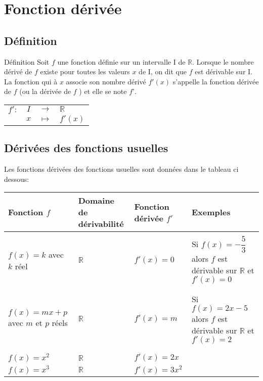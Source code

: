 \documentclass[10pt,a4paper]{article}
\def\R{{\mathbb R}}
\renewcommand{\arraystretch}{0.7}
\theoremstyle{break}
\begin{document}
\section{Fonction dérivée}
\subsection{Définition}
	\begin{bclogo}[couleur = yellow!30, arrondi = 0.1,logo=\bcbook]{Définition}
Soit $f$ une fonction définie sur un intervalle I de $\R$.
Lorsque le nombre dérivé de $f$ existe pour toutes les valeurs $x$ de I, on dit que $f$ est dérivable sur I.
La fonction qui à $x$ associe son nombre dérivé $f'(x)$ s’appelle la fonction dérivée de $f$ (ou la dérivée
de $f$ ) et elle se note $f’$.
	\begin{center}
		\begin{tabular}{lccl}
			$f':$&$I $&$\longrightarrow$&$\mathbb{R}$\\	
			&$x$&$\mapsto$&$f'(x)$\\
		\end{tabular}
	\end{center}	
\end{bclogo}
\subsection{Dérivées des fonctions usuelles}
Les fonctions dérivées des fonctions usuelles sont données dans le tableau ci dessous:
\vspace*{0.5cm}\\
\renewcommand{\arraystretch}{1.5}
\begin{tabular}{|p{4cm}|p{4cm}|p{4cm}|p{4cm}|}
	\hline
	Fonction $f$&Domaine de dérivabilité&Fonction dérivée $f'$&Exemples\\
	\hline
	&&&\\
	$f(x)=k$ \newline avec $k$ réel&$\R$&$f'(x)=0$&Si $f(x)=-\dfrac{5}{3}$ alors $f$ est dérivable sur $\R$ et $f'(x)=0$ \\
		&&&\\
	\hline
		&&&\\
		$f(x)=mx+p$ \newline avec $m$ et $p$ réels&$\R$&$f'(x)=m$&Si $f(x)=2x-5$ alors $f$ est dérivable sur $\R$ et $f'(x)=2$ \\
			&&&\\
		\hline
			&&&\\
			$f(x)=x^2$ \newline  &$\R$&$f'(x)=2x$& \\
			\hline			
				$f(x)=x^3 $ \newline  &$\R$&$f'(x)=3x^2$& \\
				\hline
\end{tabular}
\end{document}
